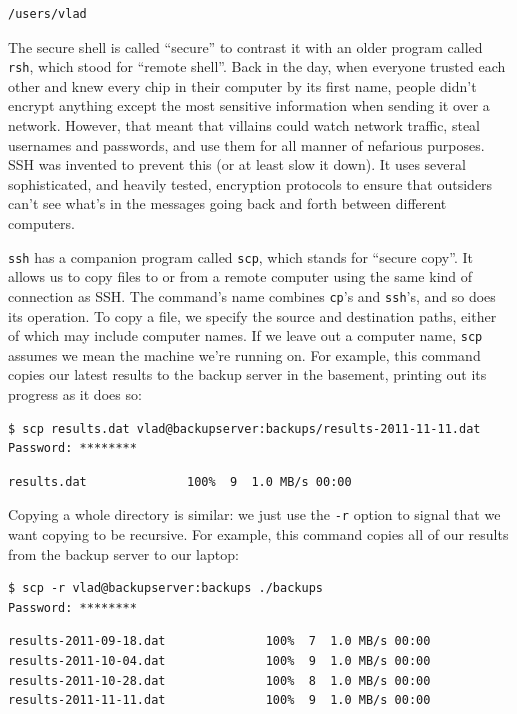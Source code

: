 \documentclass[]{book}
\begin{document}
\begin{verbatim}
/users/vlad
\end{verbatim}

The secure shell is called ``secure'' to contrast it with an older
program called \texttt{rsh}, which stood for ``remote shell''. Back in
the day, when everyone trusted each other and knew every chip in their
computer by its first name, people didn't encrypt anything except the
most sensitive information when sending it over a network. However, that
meant that villains could watch network traffic, steal usernames and
passwords, and use them for all manner of nefarious purposes. SSH was
invented to prevent this (or at least slow it down). It uses several
sophisticated, and heavily tested, encryption protocols to ensure that
outsiders can't see what's in the messages going back and forth between
different computers.

\texttt{ssh} has a companion program called \texttt{scp}, which stands
for ``secure copy''. It allows us to copy files to or from a remote
computer using the same kind of connection as SSH. The command's name
combines \texttt{cp}'s and \texttt{ssh}'s, and so does its operation. To
copy a file, we specify the source and destination paths, either of
which may include computer names. If we leave out a computer name,
\texttt{scp} assumes we mean the machine we're running on. For example,
this command copies our latest results to the backup server in the
basement, printing out its progress as it does so:

\begin{verbatim}
$ scp results.dat vlad@backupserver:backups/results-2011-11-11.dat
Password: ********
\end{verbatim}

\begin{verbatim}
results.dat              100%  9  1.0 MB/s 00:00
\end{verbatim}

Copying a whole directory is similar: we just use the \texttt{-r} option
to signal that we want copying to be recursive. For example, this
command copies all of our results from the backup server to our laptop:

\begin{verbatim}
$ scp -r vlad@backupserver:backups ./backups
Password: ********
\end{verbatim}

\begin{verbatim}
results-2011-09-18.dat              100%  7  1.0 MB/s 00:00
results-2011-10-04.dat              100%  9  1.0 MB/s 00:00
results-2011-10-28.dat              100%  8  1.0 MB/s 00:00
results-2011-11-11.dat              100%  9  1.0 MB/s 00:00
\end{verbatim}
\end{document}
